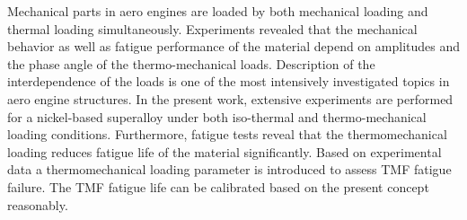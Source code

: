 \noindent
Mechanical parts in aero engines are loaded by both mechanical loading and thermal loading simultaneously. Experiments revealed that the mechanical behavior as well as fatigue performance of the material depend on amplitudes and the phase angle of the thermo-mechanical loads. Description of the interdependence of the loads is one of the most intensively investigated topics in aero engine structures. In the present work, extensive experiments are performed for a nickel-based superalloy under both iso-thermal and thermo-mechanical loading conditions. Furthermore, fatigue tests reveal that the thermomechanical loading reduces fatigue life of the material significantly. Based on experimental data a thermomechanical loading parameter is introduced to assess TMF fatigue failure. The TMF fatigue life can be calibrated based on the present concept reasonably. 